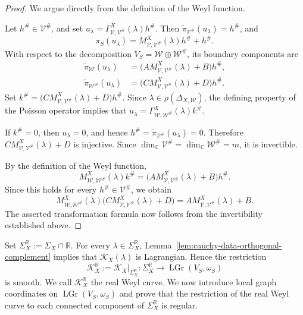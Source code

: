 \documentclass[12pt]{amsart}
\theoremstyle{plain}
\theoremstyle{definition}
\theoremstyle{remark}
\numberwithin{equation}{section} \numberwithin{figure}{section}
\newcommand{\mb}[1]{\mathbb{#1}} %
\newcommand{\mc}[1]{\mathcal{#1}}
\begin{document}
\begin{proof}
We argue directly from the definition of the Weyl function.

Let \(h^\#\in\mc V^\#\), and set
\(
    u_\lambda
    =
    \Gamma_{\mc V,\mc V^\#}^X(\lambda)h^\#.
\)
Then
\(\widetilde\pi_{\mc V^\#}(u_\lambda)=h^\#\), and
\[
    \pi_S(u_\lambda)
    =
    M_{\mc V,\mc V^\#}^X(\lambda)h^\#+h^\#.
\]
With respect to the decomposition
\(V_S=\mc W\oplus\mc W^\#\), its boundary components are
\[
\begin{aligned}
    \widetilde\pi_{\mc W}(u_\lambda)
    &=
    \bigl(
        A M_{\mc V,\mc V^\#}^X(\lambda)+B
    \bigr)h^\#,
    \\
    \widetilde\pi_{\mc W^\#}(u_\lambda)
    &=
    \bigl(
        C M_{\mc V,\mc V^\#}^X(\lambda)+D
    \bigr)h^\#.
\end{aligned}
\]
Set
\(
    k^\#
    =
    \bigl(
        C M_{\mc V,\mc V^\#}^X(\lambda)+D
    \bigr)h^\#.
\)
Since \(\lambda\in\rho(\Delta_{X,\mc W})\), the defining property of
the Poisson operator implies that
\(
    u_\lambda
    =
    \Gamma_{\mc W,\mc W^\#}^X(\lambda)k^\#.
\)

If \(k^\#=0\), then \(u_\lambda=0\), and hence
\(h^\#=\widetilde\pi_{\mc V^\#}(u_\lambda)=0\). Therefore
\(C M_{\mc V,\mc V^\#}^X(\lambda)+D\) is injective. Since
\(\dim_{\mb C}\mc V^\#=\dim_{\mb C}\mc W^\#=m\), it is invertible.

By the definition of the Weyl function,
\[
    M_{\mc W,\mc W^\#}^X(\lambda)k^\#
    =
    \bigl(
        A M_{\mc V,\mc V^\#}^X(\lambda)+B
    \bigr)h^\#.
\]
Since this holds for every \(h^\#\in\mc V^\#\), we obtain
\[
    M_{\mc W,\mc W^\#}^X(\lambda)
    \bigl(
        C M_{\mc V,\mc V^\#}^X(\lambda)+D
    \bigr)
    =
    A M_{\mc V,\mc V^\#}^X(\lambda)+B.
\]
The asserted transformation formula now follows from the
invertibility established above.
\end{proof}

Set
\(
    \Sigma_X^{\mb R}
    :=
    \Sigma_X\cap\mb R.
\)
For every \(\lambda\in\Sigma_X^{\mb R}\),
Lemma~\ref{lem:cauchy-data-orthogonal-complement} implies that
\(\mc K_X(\lambda)\) is Lagrangian. Hence the restriction
\[
    \mc K_X^{\mb R}
    :=
    \mc K_X|_{\Sigma_X^{\mb R}}:
    \Sigma_X^{\mb R}
    \longrightarrow
    \operatorname{LGr}(V_S,\omega_S)
\]
is smooth. We call \(\mc K_X^{\mb R}\) the real Weyl curve. We now
introduce local graph coordinates on
\(\operatorname{LGr}(V_S,\omega_S)\) and prove that the restriction of
the real Weyl curve to each connected component of
\(\Sigma_X^{\mb R}\) is regular.
\end{document}
